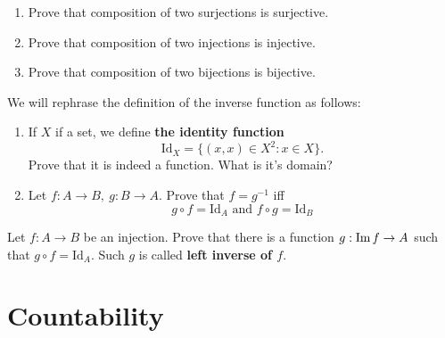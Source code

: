 \begin{prob}
    \begin{enumerate}
	   \item Prove that composition of two surjections is surjective.
	   \item Prove that composition of two injections is injective.
	   \item Prove that composition of two bijections is bijective.
    \end{enumerate}
\end{prob}

\begin{prob} We will rephrase the definition of the inverse function as follows:
	\begin{enumerate}
		\item If $X$ if a set, we define \textbf{the identity function}
			$$\text{Id}_X=\{(x,x)\in X^2 : x\in X\}.$$
			Prove that it is indeed a function. What is it's domain?
		\item Let $f:A\to B,~g:B\to A$. Prove that $f=g^{-1}$ iff
			$$g\circ f = \text{Id}_A \text{ and } f\circ g = \text{Id}_B$$
	\end{enumerate}
\end{prob}

\begin{prob}
  Let $f: A\to B$ be an injection. Prove that there is a function
  $g: \text{Im\,} f \to A$ such that $g\circ f = \text{Id}_A.$
  Such $g$ is called \textbf{left inverse of $f$}.
\end{prob}

\section{Countability}
